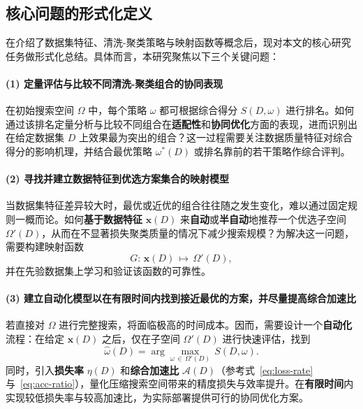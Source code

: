 \documentclass[10pt]{article} %
\numberwithin{equation}{section}
\begin{document}
\subsection{核心问题的形式化定义}
\label{subsec:problem-formalization}

在介绍了数据集特征、清洗-聚类策略与映射函数等概念后，现对本文的核心研究任务做形式化总结。具体而言，本研究聚焦以下三个关键问题：

\paragraph{(1) 定量评估与比较不同清洗-聚类组合的协同表现}
在初始搜索空间 \(\Omega\) 中，每个策略 \(\omega\) 都可根据综合得分 \(S(D,\omega)\) 进行排名。如何通过该排名定量分析与比较不同组合在\textbf{适配性}和\textbf{协同优化}方面的表现，进而识别出在给定数据集 \(D\) 上效果最为突出的组合？这一过程需要关注数据质量特征对综合得分的影响机理，并结合最优策略 \(\omega^*(D)\) 或排名靠前的若干策略作综合评判。

\paragraph{(2) 寻找并建立数据特征到优选方案集合的映射模型}
当数据集特征差异较大时，最优或近优的组合往往随之发生变化，难以通过固定规则一概而论。如何\textbf{基于数据特征} \(\mathbf{x}(D)\) 来\textbf{自动}或\textbf{半自动}地推荐一个优选子空间 \(\Omega'(D)\)，从而在不显著损失聚类质量的情况下减少搜索规模？为解决这一问题，需要构建映射函数
\[
  G:\,\mathbf{x}(D)\,\mapsto\,\Omega'(D),
\]
并在先验数据集上学习和验证该函数的可靠性。

\paragraph{(3) 建立自动化模型以在有限时间内找到接近最优的方案，并尽量提高综合加速比}
若直接对 \(\Omega\) 进行完整搜索，将面临极高的时间成本。因而，需要设计一个\textbf{自动化}流程：在给定 \(\mathbf{x}(D)\) 之后，仅在子空间 \(\Omega'(D)\) 进行快速评估，找到
\begin{equation}\label{eq:local best strategy}
  \hat{\omega}(D) 
  = 
  \arg\max_{\omega \,\in\,\Omega'(D)} \, S(D,\omega).
\end{equation}
同时，引入\textbf{损失率} \(\eta(D)\) 和\textbf{综合加速比} \(\mathcal{A}(D)\)（参考式~\eqref{eq:loss-rate} 与~\eqref{eq:acc-ratio}），量化压缩搜索空间带来的精度损失与效率提升。在\textbf{有限时间}内实现较低损失率与较高加速比，为实际部署提供可行的协同优化方案。
\end{document}
